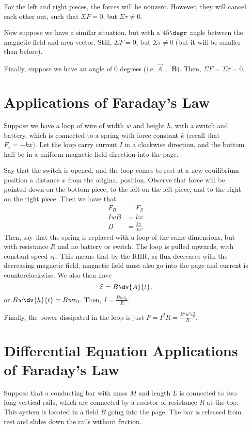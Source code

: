 \documentclass[11pt]{article}
\begin{document}
For the left and right pieces, the forces will be nonzero. However, they will cancel each other out, such that $\Sigma F = 0$, but $\Sigma \tau \ne 0$.

Now suppose we have a similar situation, but with a $45\degr$ angle between the magnetic field and area vector. Still, $\Sigma F = 0$, but $\Sigma \tau \neq 0$ (but it will be smaller than before).

Finally, suppose we have an angle of 0 degrees (i.e. $\vec{A} \perp \mathbf{B}$). Then, $\Sigma F = \Sigma \tau = 0$.

\section{Applications of Faraday's Law}
Suppose we have a loop of wire of width $w$ and height $h$, with a switch and battery, which is connected to a spring with force constant $k$ (recall that $F_s = -kx$). Let the loop carry current $I$ in a clockwise direction, and the bottom half be in a uniform magnetic field direction into the page.

Say that the switch is opened, and the loop comes to rest at a new equilibrium position a distance $x$ from the original position. Observe that force will be pointed down on the bottom piece, to the left on the left piece, and to the right on the right piece. Then we have that
\begin{align*}
    F_B &= F_S \\
    IwB &= kx \\
    B &= \frac{kx}{Iw}.
\end{align*}
Then, say that the spring is replaced with a loop of the same dimensions, but with resistance $R$ and no battery or switch. The loop is pulled upwards, with constant speed $v_0$. This means that by the RHR, as flux decreases with the decreasing magnetic field, magnetic field must also go into the page and current is counterclockwise. We also then have
\[\mathcal{E} = B \dv{A}{t},\]
or $Bw\dv{h}{t} = Bwv_0$. Then, $I = \frac{Bwv_0}{R}$.

Finally, the power dissipated in the loop is just $P = I^2R = \frac{B^2w^2v^2_0}{R}$.

\section{Differential Equation Applications of Faraday's Law}
Suppose that a conducting bar with mass $M$ and length $L$ is connected to two long vertical rails, which are connected by a resistor of resistance $R$ at the top. This system is located in a field $B$ going into the page. The bar is released from rest and slides down the rails without friction.
\end{document}
